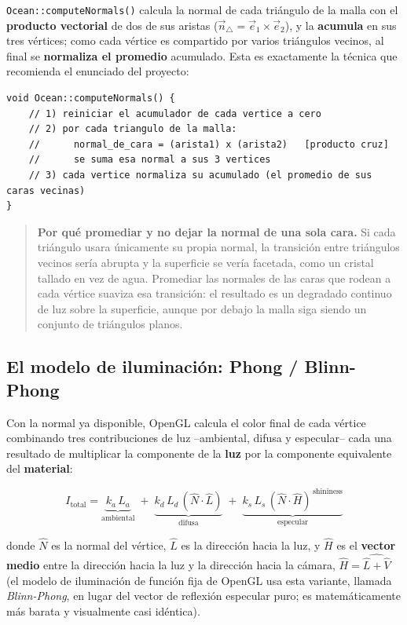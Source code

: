 ﻿\documentclass[11pt]{article}
\begin{document}
\texttt{Ocean::computeNormals()} calcula la normal de cada triángulo de la
malla con el \textbf{producto vectorial} de dos de sus aristas
($\vec n_{\triangle} = \vec e_1 \times \vec e_2$), y la \textbf{acumula} en
sus tres vértices; como cada vértice es compartido por varios triángulos
vecinos, al final se \textbf{normaliza el promedio} acumulado. Esta es
exactamente la técnica que recomienda el enunciado del proyecto:

\begin{lstlisting}
void Ocean::computeNormals() {
    // 1) reiniciar el acumulador de cada vertice a cero
    // 2) por cada triangulo de la malla:
    //      normal_de_cara = (arista1) x (arista2)   [producto cruz]
    //      se suma esa normal a sus 3 vertices
    // 3) cada vertice normaliza su acumulado (el promedio de sus caras vecinas)
}
\end{lstlisting}

\begin{quote}
\textbf{Por qué promediar y no dejar la normal de una sola cara.} Si cada
triángulo usara únicamente su propia normal, la transición entre triángulos
vecinos sería abrupta y la superficie se vería facetada, como un cristal
tallado en vez de agua. Promediar las normales de las caras que rodean a cada
vértice suaviza esa transición: el resultado es un degradado continuo de luz
sobre la superficie, aunque por debajo la malla siga siendo un conjunto de
triángulos planos.
\end{quote}

\subsection{El modelo de iluminación: Phong / Blinn-Phong}

Con la normal ya disponible, OpenGL calcula el color final de cada vértice
combinando tres contribuciones de luz --ambiental, difusa y especular-- cada
una resultado de multiplicar la componente de la \textbf{luz} por la
componente equivalente del \textbf{material}:

\[
I_{\text{total}} = \underbrace{k_a \, L_a}_{\text{ambiental}} \; + \;
\underbrace{k_d \, L_d \, (\hat N \cdot \hat L)}_{\text{difusa}} \; + \;
\underbrace{k_s \, L_s \, (\hat N \cdot \hat H)^{\,\text{shininess}}}_{\text{especular}}
\]

donde $\hat N$ es la normal del vértice, $\hat L$ es la dirección hacia la
luz, y $\hat H$ es el \textbf{vector medio} entre la dirección hacia la luz y
la dirección hacia la cámara, $\hat H = \widehat{\hat L + \hat V}$ (el modelo
de iluminación de función fija de OpenGL usa esta variante, llamada
\emph{Blinn-Phong}, en lugar del vector de reflexión especular puro; es
matemáticamente más barata y visualmente casi idéntica).
\end{document}
